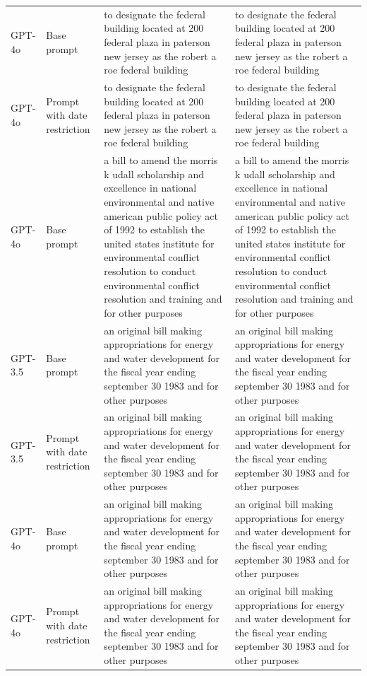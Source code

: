 \begin{longtable}{>{\raggedright\arraybackslash}p{1.4cm}>{\raggedright\arraybackslash}p{1.4cm}>{\raggedright\arraybackslash}p{5.5cm}>{\raggedright\arraybackslash}p{5.5cm}}
GPT-4o & Base prompt & to designate the federal building located at 200 federal plaza in paterson new jersey as the robert a roe federal building & to designate the federal building located at 200 federal plaza in paterson new jersey as the robert a roe federal building\\
GPT-4o & Prompt with date restriction & to designate the federal building located at 200 federal plaza in paterson new jersey as the robert a roe federal building & to designate the federal building located at 200 federal plaza in paterson new jersey as the robert a roe federal building\\
GPT-4o & Base prompt & a bill to amend the morris k udall scholarship and excellence in national environmental and native american public policy act of 1992 to establish the united states institute for environmental conflict resolution to conduct environmental conflict resolution and training and for other purposes & a bill to amend the morris k udall scholarship and excellence in national environmental and native american public policy act of 1992 to establish the united states institute for environmental conflict resolution to conduct environmental conflict resolution and training and for other purposes\\
GPT-3.5 & Base prompt & an original bill making appropriations for energy and water development for the fiscal year ending september 30 1983 and for other purposes & an original bill making appropriations for energy and water development for the fiscal year ending september 30 1983 and for other purposes\\
GPT-3.5 & Prompt with date restriction & an original bill making appropriations for energy and water development for the fiscal year ending september 30 1983 and for other purposes & an original bill making appropriations for energy and water development for the fiscal year ending september 30 1983 and for other purposes\\
GPT-4o & Base prompt & an original bill making appropriations for energy and water development for the fiscal year ending september 30 1983 and for other purposes & an original bill making appropriations for energy and water development for the fiscal year ending september 30 1983 and for other purposes\\
GPT-4o & Prompt with date restriction & an original bill making appropriations for energy and water development for the fiscal year ending september 30 1983 and for other purposes & an original bill making appropriations for energy and water development for the fiscal year ending september 30 1983 and for other purposes\\

\end{longtable}
